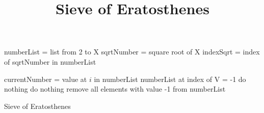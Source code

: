 \documentclass{article}
\begin{document}

\title{Sieve of Eratosthenes}

\begin{algorithm}[H]
\SetAlgoLined
{}


numberList = list from 2 to X\;
sqrtNumber = square root of X\;
indexSqrt = index of sqrtNumber in numberList\;


{
    currentNumber = value at $i$ in numberList\;
    {
        {
             {
                numberList at index of V = -1
             }
             {
               do nothing
             }
        }
    }
    {
    do nothing
    }
}
remove all elements with value -1 from numberList\;
\caption{Sieve of Eratosthenes}
\end{algorithm}
\end{document}
